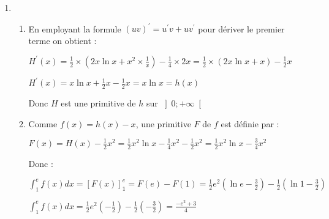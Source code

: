 \begin{corrige}
\begin{enumerate}
\begin{enumerate}[label=\alph*.]
               \par
               $f^{\prime}\left(x\right)=u^{\prime}\left(x\right)v\left(x\right)+u\left(x\right)v^{\prime}\left(x\right)=1\times \left(\ln x-1\right)+x\times \frac{1}{x}=\ln x$
               \item
               La fonction logarithme népérien est strictement négative sur $\left]0; 1\right[$ et  strictement positive sur $\left]1; +\infty \right[$.
               \par
               $f\left(1\right)=1\times \left(\ln1-1\right)=-1$
               \par
               Le tableau de variations de $f$ sur $\left]0 ; +\infty \right[$ est donc :
               <img src="/wp-content/uploads/t_6b461ea5b9ecf7ef9c477f36fb335d4e.gif" alt="" class="aligncenter size-full  img-pc" />
          \end{enumerate}
          \item
          \begin{enumerate}[label=\alph*.]
               \item
               En employant la formule $\left(uv\right)^{\prime}=u^{\prime}v+uv^{\prime}$ pour dériver le premier terme on obtient :
               \par
               $H^{\prime}\left(x\right)=\frac{1}{2}\times \left(2x \ln x +x^{2}\times \frac{1}{x}\right)-\frac{1}{4}\times 2x=\frac{1}{2}\times \left(2x\ln x+x\right)-\frac{1}{2}x$
               \par
               $H^{\prime}\left(x\right)=x\ln x+\frac{1}{2}x-\frac{1}{2}x=x\ln x=h\left(x\right)$
               \par
               Donc $H$ est une primitive de $h$ sur $\left]0; +\infty \right[$
               \item
               Comme $f\left(x\right)=h\left(x\right)-x$, une primitive $F$ de $f$ est définie par :
               \par
               $F\left(x\right)=H\left(x\right)-\frac{1}{2}x^{2}=\frac{1}{2}x^{2} \ln x-\frac{1}{4} x^{2}-\frac{1}{2}x^{2}=\frac{1}{2}x^{2} \ln x-\frac{3}{4} x^{2}$
               \par
               Donc :
               \par
               $\int_{1}^{e}f\left(x\right)dx=\left[F\left(x\right)\right]_{1}^{e}=F\left(e\right)-F\left(1\right)=\frac{1}{2}e^{2}\left(\ln e-\frac{3}{2}\right)-\frac{1}{2}\left(\ln 1-\frac{3}{2}\right)$
               \par
               $\int_{1}^{e}f\left(x\right)dx=\frac{1}{2}e^{2}\left(-\frac{1}{2}\right)-\frac{1}{2}\left(-\frac{3}{2}\right)=\frac{-e^{2}+3}{4}$

\end{enumerate}
\end{enumerate}
\end{corrige}
